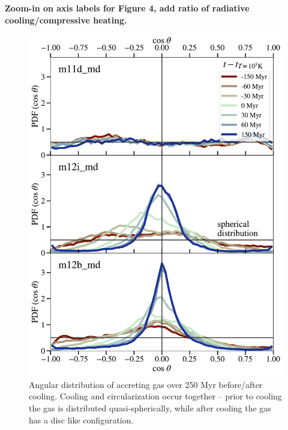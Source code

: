\documentclass[fleqn,usenatbib]{mnras}
\begin{document}


\textbf{Zoom-in on axis labels for Figure 4, add ratio of radiative cooling/compressive heating.}

\begin{figure}
    \centering
    \includegraphics[width=\columnwidth]{figures/theta_vs_t.pdf}
    \caption{
    Angular distribution of accreting gas over 250 Myr before/after cooling. Cooling and circularization occur together -- prior to cooling the gas is distributed quasi-spherically, while after cooling the gas has a disc like configuration.
}
\end{figure}
\end{document}
